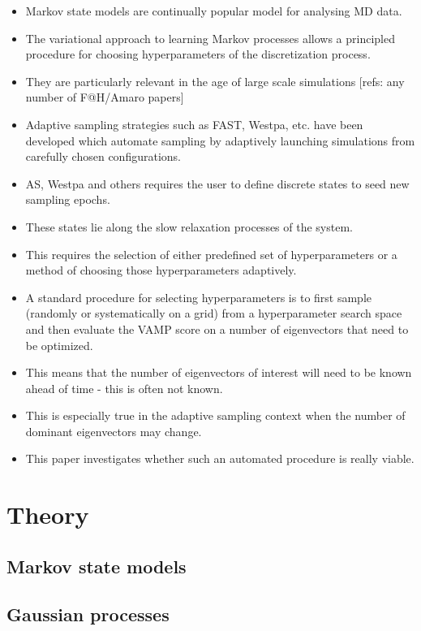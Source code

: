 \documentclass[journal=jacsat,manuscript=article]{achemso}
\begin{document}
\begin{itemize}
    \item Markov state models are continually popular model for analysing MD data. 
    \item The variational approach to learning Markov processes allows a principled procedure for choosing hyperparameters of the discretization process.
    \item They are particularly relevant in the age of large scale simulations [refs: any number of F@H/Amaro papers]
    \item Adaptive sampling strategies such as FAST, Westpa, etc.  have been developed which automate sampling by adaptively launching simulations from carefully chosen configurations. 
    \item AS, Westpa and others requires the user to define discrete states to seed new sampling epochs. 
    \item These states lie along the slow relaxation processes of the system. 
    \item This requires the selection of either predefined set of hyperparameters or a method of choosing those hyperparameters adaptively. 
    \item A standard procedure for selecting hyperparameters is to first sample (randomly or systematically on a grid) from a hyperparameter search space and then evaluate the VAMP score on a number of eigenvectors that need to be optimized. 
    \item This means that the number of eigenvectors of interest will need to be known ahead of time - this is often not known. 
    \item This is especially true in the adaptive sampling context when the number of dominant eigenvectors may change. 
    \item This paper investigates whether such an automated procedure is really viable. 

\end{itemize}




\section{Theory}
\subsection{Markov state models}
\subsection{Gaussian processes}
\end{document}
